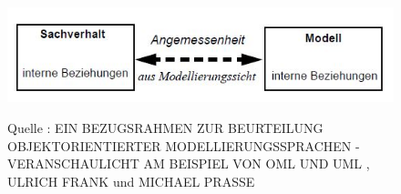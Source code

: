 \begin{center}
\begin{figure}[h]
   

\includegraphics[scale=1]{Graphics/Sachverhalt.jpg}



Quelle : EIN BEZUGSRAHMEN ZUR BEURTEILUNG OBJEKTORIENTIERTER MODELLIERUNGSSPRACHEN - VERANSCHAULICHT AM BEISPIEL VON OML UND UML , ULRICH FRANK und MICHAEL PRASSE
 

 
\label{fig9}


\end{figure}

\end{center}

